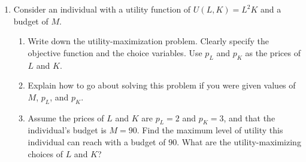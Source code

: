 \begin{enumerate}
\begin{enumerate}
    \end{enumerate}

















\item Consider an individual with a utility function of $U(L, K)=L^2K$ and a budget of $M$.

    \begin{enumerate}

    \item Write down the utility-maximization problem. Clearly specify the objective function and the choice variables. Use $p_L$ and $p_K$ as the prices of $L$ and $K$.


    \item Explain how to go about solving this problem if you were given values of $M$, $p_L$, and $p_K$.


    \item Assume the prices of $L$ and $K$ are $p_L=2$ and $p_K=3$, and that the individual's budget is $M=90$. Find the maximum level of utility this individual can reach with a budget of $90$. What are the utility-maximizing choices of $L$ and $K$?



\end{enumerate}
\end{enumerate}
